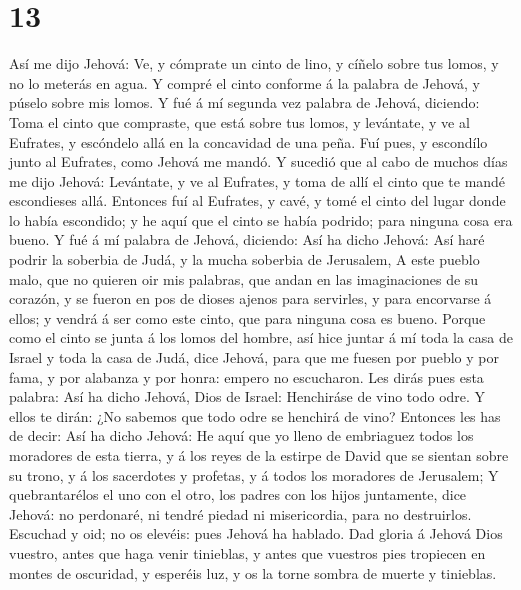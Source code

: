 \hypertarget{section-12}{%
\section{13}\label{section-12}}

 Así me dijo Jehová: Ve, y cómprate un cinto de lino, y
cíñelo sobre tus lomos, y no lo meterás en agua.  Y compré
el cinto conforme á la palabra de Jehová, y púselo sobre mis lomos.
 Y fué á mí segunda vez palabra de Jehová, diciendo:
 Toma el cinto que compraste, que está sobre tus lomos, y
levántate, y ve al Eufrates, y escóndelo allá en la concavidad de una
peña.  Fuí pues, y escondílo junto al Eufrates, como
Jehová me mandó.  Y sucedió que al cabo de muchos días me
dijo Jehová: Levántate, y ve al Eufrates, y toma de allí el cinto que te
mandé escondieses allá.  Entonces fuí al Eufrates, y cavé,
y tomé el cinto del lugar donde lo había escondido; y he aquí que el
cinto se había podrido; para ninguna cosa era bueno.  Y
fué á mí palabra de Jehová, diciendo:  Así ha dicho
Jehová: Así haré podrir la soberbia de Judá, y la mucha soberbia de
Jerusalem,  A este pueblo malo, que no quieren oir mis
palabras, que andan en las imaginaciones de su corazón, y se fueron en
pos de dioses ajenos para servirles, y para encorvarse á ellos; y vendrá
á ser como este cinto, que para ninguna cosa es bueno. 
Porque como el cinto se junta á los lomos del hombre, así hice juntar á
mí toda la casa de Israel y toda la casa de Judá, dice Jehová, para que
me fuesen por pueblo y por fama, y por alabanza y por honra: empero no
escucharon.  Les dirás pues esta palabra: Así ha dicho
Jehová, Dios de Israel: Henchiráse de vino todo odre. Y ellos te dirán:
¿No sabemos que todo odre se henchirá de vino?  Entonces
les has de decir: Así ha dicho Jehová: He aquí que yo lleno de
embriaguez todos los moradores de esta tierra, y á los reyes de la
estirpe de David que se sientan sobre su trono, y á los sacerdotes y
profetas, y á todos los moradores de Jerusalem;  Y
quebrantarélos el uno con el otro, los padres con los hijos juntamente,
dice Jehová: no perdonaré, ni tendré piedad ni misericordia, para no
destruirlos.  Escuchad y oid; no os elevéis: pues Jehová
ha hablado.  Dad gloria á Jehová Dios vuestro, antes que
haga venir tinieblas, y antes que vuestros pies tropiecen en montes de
oscuridad, y esperéis luz, y os la torne sombra de muerte y tinieblas.
